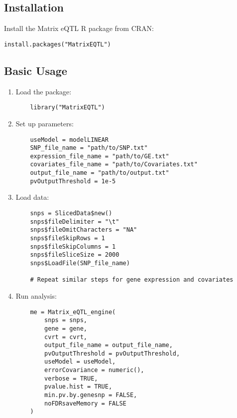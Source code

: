 \documentclass[12pt,a4paper]{article}
\begin{document}
\subsection{Installation}
Install the Matrix eQTL R package from CRAN:

\begin{verbatim}
install.packages("MatrixEQTL")
\end{verbatim}

\subsection{Basic Usage}

\begin{enumerate}
    \item Load the package:
    \begin{verbatim}
    library("MatrixEQTL")
    \end{verbatim}
    
    \item Set up parameters:
    \begin{verbatim}
    useModel = modelLINEAR
    SNP_file_name = "path/to/SNP.txt"
    expression_file_name = "path/to/GE.txt"
    covariates_file_name = "path/to/Covariates.txt"
    output_file_name = "path/to/output.txt"
    pvOutputThreshold = 1e-5
    \end{verbatim}
    
    \item Load data:
    \begin{verbatim}
    snps = SlicedData$new()
    snps$fileDelimiter = "\t"
    snps$fileOmitCharacters = "NA"
    snps$fileSkipRows = 1
    snps$fileSkipColumns = 1
    snps$fileSliceSize = 2000
    snps$LoadFile(SNP_file_name)
    
    # Repeat similar steps for gene expression and covariates
    \end{verbatim}
    
    \item Run analysis:
    \begin{verbatim}
    me = Matrix_eQTL_engine(
        snps = snps,
        gene = gene,
        cvrt = cvrt,
        output_file_name = output_file_name,
        pvOutputThreshold = pvOutputThreshold,
        useModel = useModel,
        errorCovariance = numeric(),
        verbose = TRUE,
        pvalue.hist = TRUE,
        min.pv.by.genesnp = FALSE,
        noFDRsaveMemory = FALSE
    )
    \end{verbatim}
\end{enumerate}
\end{document}
